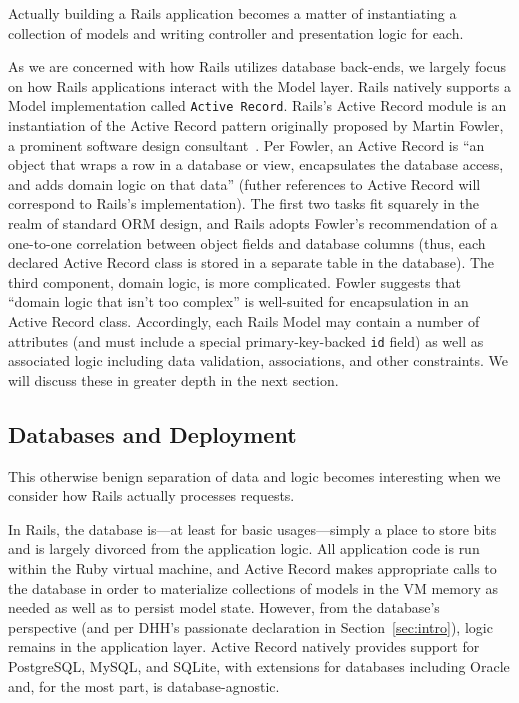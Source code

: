 Actually building a Rails application becomes a matter of instantiating a collection of models and writing controller and presentation logic for each.

As we are concerned with how Rails utilizes database back-ends, we largely focus on how Rails applications interact with the Model layer. Rails natively supports a Model implementation called \texttt{Active Record}. Rails's Active Record module is an instantiation of the Active Record pattern originally proposed by Martin Fowler, a prominent software design consultant~\cite{fowler-book}. Per Fowler, an Active Record is ``an object that wraps a row in a database or view, encapsulates the database access, and adds domain logic on that data'' (futher references to Active Record will correspond to Rails's implementation). The first two tasks fit squarely in the realm of standard ORM design, and Rails adopts Fowler's recommendation of a one-to-one correlation between object fields and database columns (thus, each declared Active Record class is stored in a separate table in the database). The third component, domain logic, is more complicated. Fowler suggests that ``domain logic that isn't too complex'' is well-suited for encapsulation in an Active Record class. Accordingly, each Rails Model may contain a number of attributes (and must include a special primary-key-backed \texttt{id} field) as well as associated logic including data validation, associations, and other constraints. We will discuss these in greater depth in the next section.

\subsection{Databases and Deployment}
\label{sec:deployment}

This otherwise benign separation of data and logic becomes interesting when we consider how Rails actually processes requests.

In Rails, the database is---at least for basic usages---simply a place to store bits and is largely divorced from the application logic. All application code is run within the Ruby virtual machine, and Active Record makes appropriate calls to the database in order to materialize collections of models in the VM memory as needed as well as to persist model state. However, from the database's perspective (and per DHH's passionate declaration in Section~\ref{sec:intro}), logic remains in the application layer. Active Record natively provides support for PostgreSQL, MySQL, and SQLite, with extensions for databases including Oracle and, for the most part, is database-agnostic.

